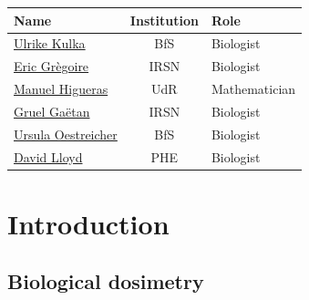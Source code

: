\documentclass[]{scrartcl}
\begin{document}
\begin{longtable}[]{@{}lcl@{}}
\toprule
Name & Institution & Role\tabularnewline
\midrule
\endhead
\href{https://orcid.org/0000-0002-7734-3162}{Ulrike Kulka} & BfS & Biologist\tabularnewline
\href{https://www.researchgate.net/profile/Eric_Gregoire2}{Eric Grègoire} & IRSN & Biologist\tabularnewline
\href{https://investigacion.unirioja.es/investigadores/1322/detalle}{Manuel Higueras} & UdR & Mathematician\tabularnewline
\href{https://www.researchgate.net/profile/Gruel_Gaetan}{Gruel Gaëtan} & IRSN & Biologist\tabularnewline
\href{https://www.researchgate.net/scientific-contributions/2121336457_Ursula_Oestreicher}{Ursula Oestreicher} & BfS & Biologist\tabularnewline
\href{https://www.phe-protectionservices.org.uk/cds/team/david_lloyd}{David Lloyd} & PHE & Biologist\tabularnewline
\bottomrule
\end{longtable}

\hypertarget{intro}{%
\section{Introduction}\label{intro}}

\hypertarget{intro-biodosimetry}{%
\subsection{Biological dosimetry}\label{intro-biodosimetry}}
\end{document}
